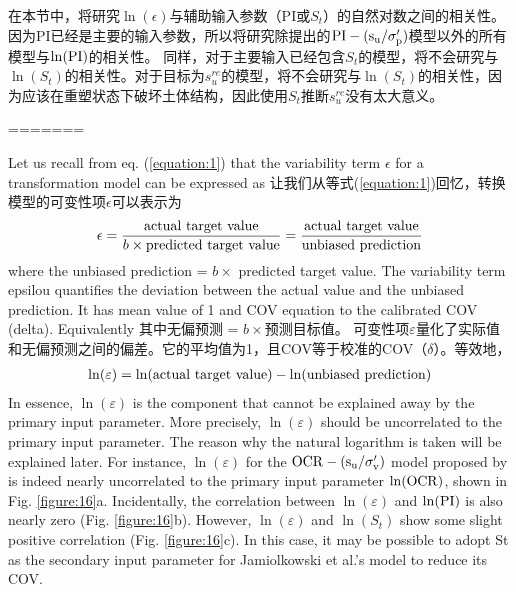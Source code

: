 \begin{paracol}{2}
    在本节中，将研究$\ln(\epsilon)$与辅助输入参数（PI或$S_t$）的自然对数之间的相关性。 因为PI已经是主要的输入参数，所以将研究除\citet{Mesri1975409, Mesri1989162}提出的$\rm{PI}-(s_u/\sigma_p')$模型以外的所有模型与$\ln(\rm{PI})$的相关性。 同样，对于主要输入已经包含$S_t$的模型，将不会研究与$\ln(S_t)$的相关性。对于目标为$s_u^{re}$的模型，将不会研究与$\ln(S_t)$的相关性，因为应该在重塑状态下破坏土体结构，因此使用$S_t$推断$s_u^{re}$没有太大意义。

    \switchcolumn*
=======
\begin{Parallel}{0.60\textwidth}{}
    \ParallelLText
    {
        Let us recall from eq. (\ref{equation:1}) that the variability term $\epsilon$ for a  transformation model can be expressed as
    }
    \ParallelRText
    {
        让我们从等式(\ref{equation:1})回忆，转换模型的可变性项$\epsilon$可以表示为
    }
    \ParallelPar
    \begin{align}
        \epsilon=\dfrac{\rm{actual~target~value}}{b\times{}\rm{predicted~target~value}}=\dfrac{\rm{actual~target~value}}{\rm{unbiased~prediction}}
        \label{equation:2}
    \end{align}
    \ParallelLText
    {
        where the unbiased prediction = $b\times$ predicted target value. The variability term epsilou quantifies the deviation between the actual value and the unbiased prediction. It has mean value of 1 and COV equation to the calibrated COV (delta). Equivalently
    }
    \ParallelRText
    {
        其中无偏预测 = $b\times$预测目标值。 可变性项$\varepsilon$量化了实际值和无偏预测之间的偏差。它的平均值为1，且COV等于校准的COV（$\delta$）。等效地，
    }
    \ParallelPar
    \begin{align}
        \ln(\varepsilon)=\ln(\rm{actual~target~value})-\ln({\rm{unbiased~prediction}})
        \label{equation:3}
    \end{align}
    \ParallelLText
    {
        In essence, $\ln(\varepsilon)$ is the component that cannot be explained away by the primary input parameter. More precisely, $\ln(\varepsilon)$ should be uncorrelated to the primary input parameter. The reason why the natural logarithm is taken will be explained later. For instance, $\ln(\varepsilon)$ for the $\rm{OCR}-(s_u/\sigma_v')$ model proposed by \citet{Jamiolkowski198557} is indeed nearly uncorrelated to the primary input parameter $\ln(\rm{OCR})$, shown in Fig. \ref{figure:16}a. Incidentally, the correlation between $\ln(\varepsilon)$ and $\ln(\rm{PI})$ is also nearly zero (Fig. \ref{figure:16}b). However, $\ln(\varepsilon)$ and $\ln(S_t)$ show some slight positive correlation (Fig. \ref{figure:16}c). In this case, it may be possible to adopt St as the secondary input parameter for Jamiolkowski et al.’s model to reduce its COV.
}
\end{Parallel}
\end{paracol}
